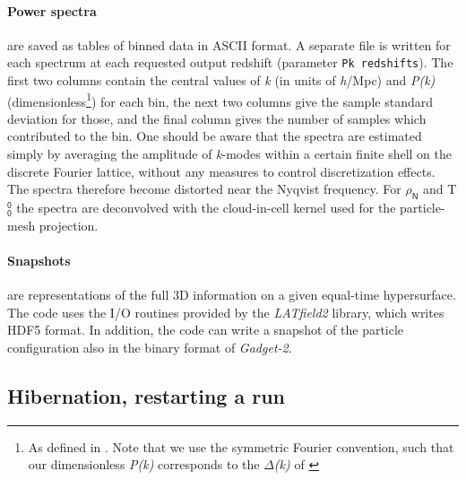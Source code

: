 \documentclass[a4paper,10pt]{article}
\begin{document}
\paragraph{Power spectra} are saved as tables of binned data in ASCII format. A separate file is written for each spectrum at each requested
output redshift (parameter \texttt{Pk redshifts}). The first two columns contain the central values of \textit{k} (in units of
\textit{h}/Mpc) and \textit{P(k)} (dimensionless\footnote{As defined in \cite{Adamek:2015eda}. Note that we use the symmetric Fourier
convention, such that our dimensionless \textit{P(k)} corresponds to the $\mathsf{\Delta}$\textit{(k)} of \cite{Bernardeau:2001qr}}) for
each bin, the next two columns give the sample standard deviation for those, and the final column gives the number of samples which
contributed to the bin.
One should be aware that the spectra are estimated simply by averaging the amplitude of \textit{k}-modes within a certain finite shell on
the discrete Fourier lattice, without any measures to control discretization effects. The spectra therefore become distorted near the
Nyqvist frequency. For $\mathsf{\rho}_\mathsf{N}$ and T$^\mathsf{0}_\mathsf{0}$ the spectra are deconvolved with the cloud-in-cell kernel
used for the particle-mesh projection.

\paragraph{Snapshots} are representations of the full 3D information on a given equal-time hypersurface. The code uses the I/O routines
provided by the \textit{LATfield2} library, which writes HDF5 format. In addition, the code can write a snapshot of the particle
configuration also in the binary format of \textit{Gadget-2}. %

\subsection{Hibernation, restarting a run}
\end{document}
